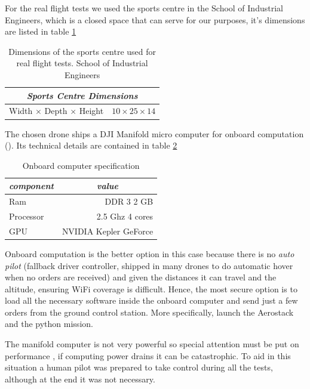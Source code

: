     For the real flight tests we used the sports centre in the School of Industrial Engineers, which is a closed space that can serve for our purposes, it's dimensions are listed in table \ref{ch_5:table:sports_dims}

    \begin{table}[!h]
      \centering
      \begin{tabular}{lr} \toprule
        \multicolumn{2}{c}{\textit{Sports Centre Dimensions}}        \\ \midrule
        Width $\times$ Depth $\times$ Height & $10 \times 25 \times 14$ \\ \bottomrule
        \hline
      \end{tabular}
      \caption{Dimensions of the sports centre used for real flight tests. School of Industrial Engineers}
      \label{ch_5:table:sports_dims}
    \end{table}

    The chosen drone ships a DJI Manifold micro computer for onboard computation (\cite{dji_manifold_web}). Its technical details are contained in table \ref{ch_5:table:manifold_specs}

    \begin{table}[!h]
      \centering
      \begin{tabular}{lr} \toprule
        \multicolumn{1}{c}{\textit{component}} & \multicolumn{1}{c}{\textit{value}}   \\ \midrule
        Ram           & DDR 3 2 GB     \\
        Processor     & 2.5 Ghz 4 cores \\
        GPU           & NVIDIA Kepler GeForce \\ \bottomrule
        \hline
      \end{tabular}
      \caption{Onboard computer specification}
      \label{ch_5:table:manifold_specs}
    \end{table}

    Onboard computation is the better option in this case because there is no \textit{auto pilot} (fallback driver controller, shipped in many drones to do automatic hover when no orders are received) and given the distances it can travel and the altitude, ensuring WiFi coverage is difficult. Hence, the most secure option is to load all the necessary software inside the onboard computer and send just a few orders from the ground control station. More specifically, launch the Aerostack and the python mission.

    The manifold computer is not very powerful so special attention must be put on performance , if computing power drains it can be catastrophic. To aid in this situation a human pilot was prepared to take control during all the tests, although at the end it was not necessary.

